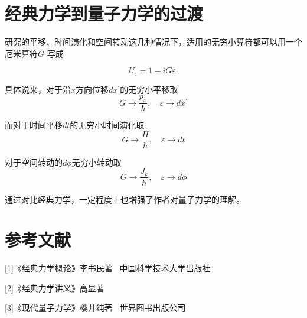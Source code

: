 \documentclass[12pt]{ctexart}
\begin{document}
\section{经典力学到量子力学的过渡}
研究的平移、时间演化和空间转动这几种情况下，适用的无穷小算符都可以用一个厄米算符$G$ 写成

\begin{equation}U_{\epsilon}=1-iG\varepsilon.
\end{equation}
    

具体说来，对于沿$x$方向位移$dx^\prime$的无穷小平移取
\begin{equation}G\to\frac{p_x}{\hbar},\quad\varepsilon\to dx^{\prime}
\end{equation}
    


而对于时间平移$dt$的无穷小时间演化取
\begin{equation}
    G\to\frac H\hbar,\quad\varepsilon\to dt
\end{equation}

对于空间转动的$d\phi$无穷小转动取
\begin{equation}G\to\frac{J_k}{\hbar},\quad\varepsilon\to d\phi 
\end{equation}

通过对比经典力学，一定程度上也增强了作者对量子力学的理解。




\section*{参考文献}
[1]《经典力学概论》李书民著 \ 中国科学技术大学出版社

[2]《经典力学讲义》高显著 

[3]《现代量子力学》樱井纯著 \ 世界图书出版公司
























































\end{document}
